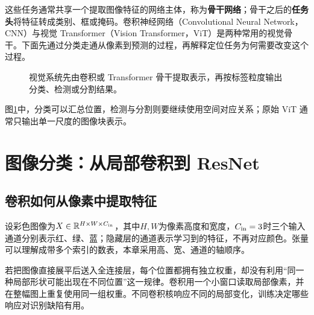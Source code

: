 这些任务通常共享一个提取图像特征的网络主体，称为\textbf{骨干网络}；骨干之后的\textbf{任务头}将特征转成类别、框或掩码。卷积神经网络（Convolutional Neural Network，CNN）与视觉 Transformer（Vision Transformer，ViT）是两种常用的视觉骨干。下面先通过分类走通从像素到预测的过程，再解释定位任务为何需要改变这个过程。
\begin{figure}[htbp]
\centering
{}
\caption{视觉系统先由卷积或 Transformer 骨干提取表示，再按标签粒度输出分类、检测或分割结果。}
\label{fig:vision-output-granularity}
\end{figure}
图\ref{fig:vision-output-granularity}中，分类可以汇总位置，检测与分割则要继续使用空间对应关系；原始 ViT 通常只输出单一尺度的图像块表示。

\section{图像分类：从局部卷积到 ResNet}
\subsection{卷积如何从像素中提取特征}
设彩色图像为$X\in\mathbb{R}^{H\times W\times C_{\rm in}}$，其中$H,W$为像素高度和宽度，$C_{\rm in}=3$时三个输入通道分别表示红、绿、蓝；隐藏层的通道表示学习到的特征，不再对应颜色。张量可以理解成带多个索引的数表，本章采用高、宽、通道的轴顺序。

若把图像直接展平后送入全连接层，每个位置都拥有独立权重，却没有利用“同一种局部形状可能出现在不同位置”这一规律。卷积用一个小窗口读取局部像素，并在整幅图上重复使用同一组权重。不同卷积核响应不同的局部变化，训练决定哪些响应对识别缺陷有用。

